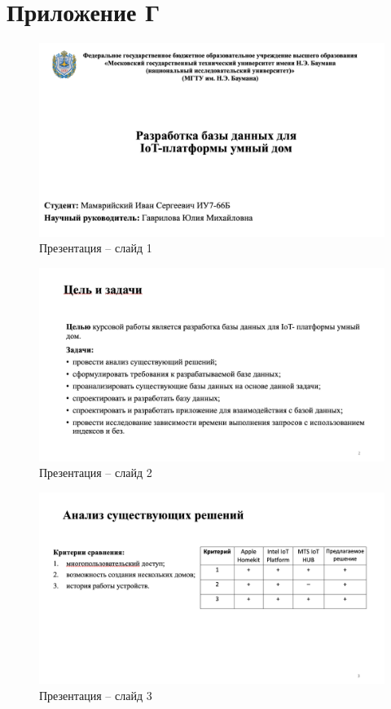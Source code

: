 \chapter*{Приложение Г}

\begin{figure}[H]
    \includegraphics[width=1\linewidth]{img/1.png}
    \caption{Презентация -- слайд 1}
\end{figure}
\noindent

\begin{figure}[H]
    \includegraphics[width=1\linewidth]{img/2.png}
    \caption{Презентация -- слайд 2}
\end{figure}
\noindent

\begin{figure}[H]
    \includegraphics[width=1\linewidth]{img/3.png}
    \caption{Презентация -- слайд 3}
\end{figure}
\noindent


